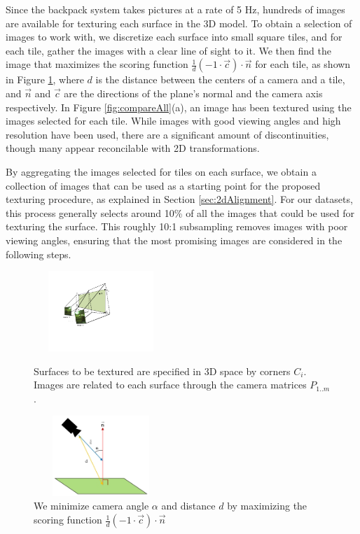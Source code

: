 \documentclass{llncs}
\begin{document}
Since the backpack system takes pictures at a rate of 5 Hz, hundreds
of images are available for texturing each surface in the 3D model. To
obtain a selection of images to work with, we discretize each surface
into small square tiles, and for each tile, gather the images with a
clear line of sight to it. We then find the image that maximizes the
scoring function $\frac{1}{d} (-1 \cdot \vec{c}) \cdot \vec{n}$ for
each tile, as shown in Figure \ref{fig:scoringFunction}, where $d$ is
the distance between the centers of a camera and a tile, and $\vec{n}$
and $\vec{c}$ are the directions of the plane's normal and the camera
axis respectively. In Figure \ref{fig:compareAll}(a), an image has
been textured using the images selected for each tile. While images
with good viewing angles and high resolution have been used, there are
a significant amount of discontinuities, though many appear
reconcilable with 2D transformations.

By aggregating the images selected for tiles on each surface, we
obtain a collection of images that can be used as a starting point for
the proposed texturing procedure, as explained in Section
\ref{sec:2dAlignment}. For our datasets, this process generally
selects around 10\% of all the images that could be used for texturing
the surface. This roughly 10:1 subsampling removes images with poor
viewing angles, ensuring that the most promising images are considered
in the following steps.


\begin{figure}
  \begin{minipage}[b]{0.45\linewidth}
    \centering
    \includegraphics[height=1.2in,width=2in]{Projection.pdf}
    \caption{Surfaces to be textured are specified in 3D space by
      corners $C_i$. Images are related to each surface through the
      camera matrices $P_{1..m}$. }
    \label{fig:projection}
  \end{minipage}
  \hspace{0.5cm}
  \begin{minipage}[b]{0.45\linewidth}
    \centering
    \includegraphics[height=1.2in, width=2in]{scoringFunction.jpg}
    \caption{We minimize camera angle $\alpha$ and distance $d$ by
      maximizing the scoring function $\frac{1}{d} (-1 \cdot \vec{c})
      \cdot \vec{n}$}
    \label{fig:scoringFunction}
  \end{minipage}
\end{figure}
\end{document}
